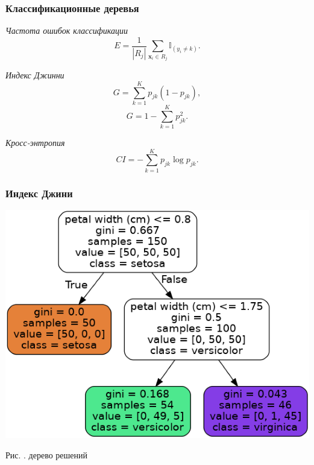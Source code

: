 \documentclass[pdf, 9pt, usenames, dvipsnames, unicode, hyperref={bookmarks=true,bookmarksopen=false, bookmarksnumbered}]{beamer}
\begin{document}

\begin{frame}\frametitle{Классификационные деревья}

\textit{Частота ошибок классификации}
$$E = \dfrac{1}{|R_j|} \sum\limits_{\textbf{x}_i \in R_j}^{} \mathbb{I}_{(y_i \neq k)}.$$

\textit{Индекс Джинни}
$$G = \sum\limits_{k=1}^{K} {p}_{jk}(1-{p}_{jk}),$$
$$G = 1 - \sum\limits_{k=1}^{K} p_{jk}^2.$$

\textit{Кросс-энтропия}
$$CI = - \sum\limits_{k=1}^{K} {p}_{jk} \log {p}_{jk}.$$

\end{frame}


\begin{frame}\frametitle{Индекс Джини}

\begin{center}
	\includegraphics[scale=0.3]{piciris}
\end{center}
\begin{center}
	Рис. . дерево решений
\end{center}

\end{frame}

\end{document}
